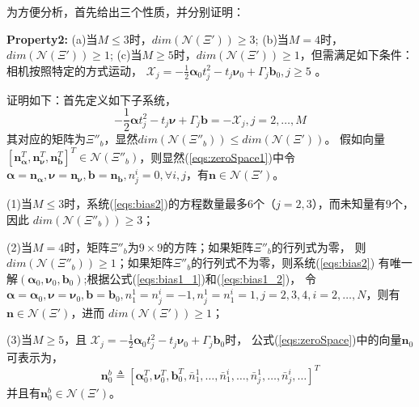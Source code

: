 \documentclass{article}
\begin{document}
\par
为方便分析，首先给出三个性质，并分别证明：
\par
\textbf{Property2: }(a)当$M\leqslant 3$时，$dim(\mathcal{N}(\Xi'))\geqslant 3$; 
(b)当$M=4$时，$dim(\mathcal{N}(\Xi'))\geqslant 1$; 
(c)当$M\geqslant 5$时，$dim(\mathcal{N}(\Xi'))\geqslant 1$，但需满足如下条件：相机按照特定的方式运动，
$\mathcal{X}_j=-\frac{1}{2}\mathbf{\alpha}_{0}t_j^2-t_j\mathbf{\nu}_0+\Gamma_j\textbf{b}_0, j\geqslant 5$ 。
\par
证明如下：首先定义如下子系统，
\begin{equation}\label{eqs:bias2}
    -\frac{1}{2}\mathbf{\alpha}t_j^2-t_j\mathbf{\nu}+\Gamma_j\textbf{b}=-\mathcal{X}_j, j=2,\dots,M
\end{equation}
其对应的矩阵为$\Xi''_b$，显然$dim(\mathcal{N}(\Xi''_b))\leqslant dim(\mathcal{N}(\Xi'))$。
假如向量$\left[\textbf{n}_{\mathbf{\alpha}}^T,\textbf{n}_{\mathbf{\nu}}^T,
\textbf{n}_{\textbf{b}}^T\right]^T\in \mathcal{N}(\Xi''_b)$，则显然(\ref{eqs:zeroSpace1})中令
$\mathbf{\alpha}=\textbf{n}_{\mathbf{\alpha}},\mathbf{\nu}=\textbf{n}_{\mathbf{\nu}},
\textbf{b}=\textbf{n}_{\textbf{b}},n_j^i=0,\forall i,j$，有$\textbf{n}\in \mathcal{N}(\Xi')$。
\par
(1)当$M\leqslant 3$时，系统(\ref{eqs:bias2})的方程数量最多6个（$j=2,3$），而未知量有9个，因此
$dim(\mathcal{N}(\Xi''_b))\geqslant 3$；
\par
(2)当$M=4$时，矩阵$\Xi''_b$为$9\times 9$的方阵；如果矩阵$\Xi''_b$的行列式为零，
则$dim(\mathcal{N}(\Xi''_b))\geqslant 1$；如果矩阵$\Xi''_b$的行列式不为零，则系统(\ref{eqs:bias2})
有唯一解$(\mathbf{\alpha}_0,\mathbf{\nu}_0,\textbf{b}_0)$;根据公式(\ref{eqs:bias1_1})和(\ref{eqs:bias1_2})，
令$\mathbf{\alpha}=\mathbf{\alpha}_0,\mathbf{\nu}=\mathbf{\nu}_0,\textbf{b}=\textbf{b}_0,
n_1^1=n_j^i=-1,n_j^1=n_1^i=1,j=2,3,4,i=2,\dots,N$，则有$\textbf{n}\in \mathcal{N}(\Xi')$，进而
$dim(\mathcal{N}(\Xi'))\geqslant 1$；
\par
(3)当$M\geqslant 5$，且
$\mathcal{X}_j=-\frac{1}{2}\mathbf{\alpha}_{0}t_j^2-t_j\mathbf{\nu}_0+\Gamma_j\textbf{b}_0$时，
公式(\ref{eqs:zeroSpace})中的向量$\textbf{n}_0$可表示为，
\begin{equation}\label{eqs:zeroSpace2}
    \textbf{n}_0^b\triangleq \left[\mathbf{\alpha}_0^T,\mathbf{\nu}_0^T,\textbf{b}_0^T,\bar{n}_1^1,\dots,\bar{n}_1^i,
    \dots,\bar{n}_j^1,\dots,\bar{n}_j^i,\dots\right]^T
\end{equation}
并且有$\textbf{n}_0^b\in \mathcal{N}(\Xi')$。
\end{document}
